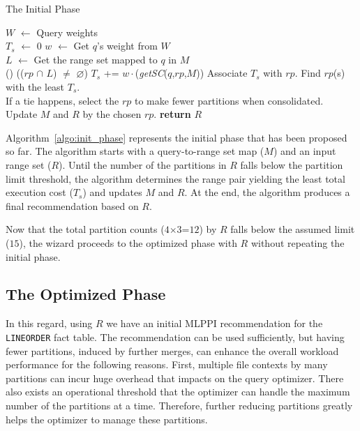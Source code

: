 \documentclass[runningheads]{comsis2}
\begin{document}
\begin{algorithm}[t]
\caption{The Initial Phase}
\label{algo:init_phase}
{
	$W$ $\leftarrow$ Query weights \\
	{
		{	 
			$T_{s}$ $\leftarrow$ 0 \;
			{	
				$w$ $\leftarrow$ Get $q$'s weight from $W$ \\
				$L$ $\leftarrow$ Get the range set mapped to $q$ in $M$ \\
				\uIf() {(($rp$ $\cap$ $L$) $\neq$ $\varnothing$)}
				{
					$T_{s}$ += $w{\cdot}$({\it getSC}($q$,$rp$,$M$)) 
				}
			}
			Associate $T_{s}$ with $rp$.
		}
		Find $rp$(s) with the least $T_{s}$. \\
		If a tie happens, select the $rp$ to make fewer partitions when consolidated. \\
		Update $M$ and $R$ by the chosen $rp$.
	}
	{\bf return} $R$\;
}
\end{algorithm}


Algorithm~\ref{algo:init_phase} represents the initial phase 
that has been proposed so far. 
The algorithm starts with a query-to-range set map ($M$) and an input range set ($R$). 
Until the number of the partitions in $R$ falls below the partition limit threshold, 
the algorithm determines the range pair yielding the least total execution cost ($T_{s}$) 
and updates $M$ and $R$. At the end, the algorithm produces a final recommendation based on $R$.

Now that the total partition counts ($4${$\times$}$3$=$12$) by $R$ falls  
below the assumed limit ($15$), the wizard 
proceeds to the optimized phase with $R$ without repeating the initial phase. 

\subsection{The Optimized Phase}
\label{sec:opt_phase}

In this regard, using $R$ we have an initial MLPPI recommendation for the {\tt LINEORDER} fact table.
The recommendation can be used sufficiently, but 
having fewer partitions, induced by further merges, 
can enhance the overall workload performance for the following reasons. 
First, multiple file contexts by many partitions can incur 
huge overhead that impacts on the query optimizer. 
There also exists an operational threshold 
that the optimizer can handle the maximum number of the partitions at a time.
Therefore, further reducing partitions greatly helps the optimizer to manage these partitions.
\end{document}
